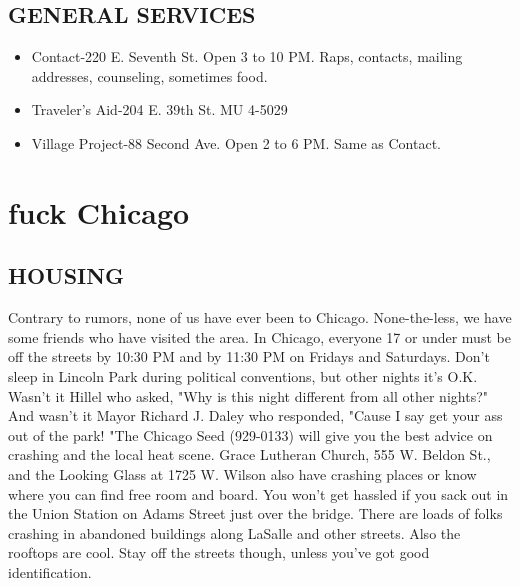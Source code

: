 \documentclass[11pt,twoside,a4paper]{book}
\begin{document}
\subsection{GENERAL SERVICES}
\begin{itemize}
\item Contact-220 E. Seventh St. Open 3 to 10 PM. Raps, contacts, mailing addresses, counseling, sometimes food. 
\item Traveler's Aid-204 E. 39th St. MU 4-5029 
\item Village Project-88 Second Ave. Open 2 to 6 PM. Same as Contact. 
\end{itemize}

\section{fuck Chicago}
\subsection{HOUSING}
Contrary to rumors, none of us have ever been to Chicago. None-the-less, we have some friends who have visited the area. In Chicago, everyone 17 or under must be off the streets by 10:30 PM and by 11:30 PM on Fridays and Saturdays. Don't sleep in Lincoln Park during political conventions, but other nights it's O.K. Wasn't it Hillel who asked, "Why is this night different from all other nights?" And wasn't it Mayor Richard J. Daley who responded, "Cause I say get your ass out of the park! "The Chicago Seed (929-0133) will give you the best advice on crashing and the local heat scene. Grace Lutheran Church, 555 W. Beldon St., and the Looking Glass at 1725 W. Wilson also have crashing places or know where you can find free room and board. You won't get hassled if you sack out in the Union Station on Adams Street just over the bridge. There are loads of folks crashing in abandoned buildings along LaSalle and other streets. Also the rooftops are cool. Stay off the streets though, unless you've got good identification.~\\
\end{document}
